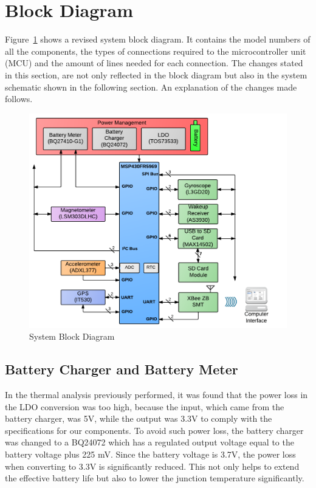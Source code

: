 \section{Block Diagram}

Figure~\ref{fig:blockDiagram} shows a revised system block diagram. It contains the model numbers of all the components, the types of connections required to the microcontroller unit (MCU) and the amount of lines needed for each connection.  The changes stated in this section, are not only reflected in the block diagram but also in the system schematic shown in the following section.  An explanation of the changes made follows.

\begin{figure}[H]
\centering
	\includegraphics[width=\textwidth]{img/blockDiagram}
	\caption{System Block Diagram \label{fig:blockDiagram}}
\end{figure}

\subsection{Battery Charger and Battery Meter}

In the thermal analysis previously performed, it was found that the power loss in the LDO conversion was too high, because the input, which came from the battery charger, was 5V, while the output was 3.3V to comply with the specifications for our components.  To avoid such power loss, the battery charger was changed to a BQ24072 which has a regulated output voltage equal to the battery voltage plus 225 mV.  Since the battery voltage is 3.7V, the power loss when converting to 3.3V is significantly reduced.  This not only helps to extend the effective battery life but also to lower the junction temperature significantly.

